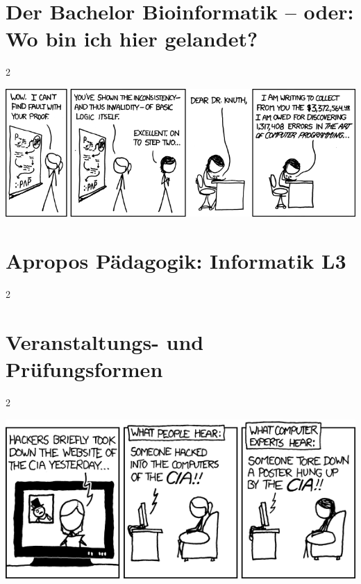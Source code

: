 \documentclass[a4paper,12pt]{scrartcl}
\newcommand{\spaltenanfang}{\begin{multicols}{2}}
\newcommand{\spaltenende}{\end{multicols}}
\begin{document}

\newpage
\section{Der Bachelor Bioinformatik – oder: Wo bin ich hier gelandet?}
\spaltenanfang

\spaltenende

\vspace{25mm}
\begin{center}
\includegraphics[scale=0.75]{comics/applied_math}
\end{center}





\section{Apropos Pädagogik: Informatik L3}

\spaltenanfang

\spaltenende




\newpage
\section{Veranstaltungs- und Prüfungsformen}

\spaltenanfang

\spaltenende

\vspace{1cm}

\begin{center}
\includegraphics[scale=0.8]{comics/cia}
\end{center}
\end{document}
